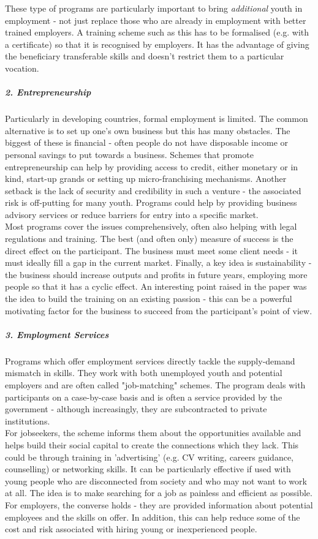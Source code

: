 \documentclass[a4paper, 10pt]{article}
\begin{document}
\noindent These type of programs are particularly important to bring \textit{additional} youth in employment - not just replace those who are already in employment with better trained employers. A training scheme such as this has to be formalised (e.g. with a certificate) so that it is recognised by employers. It has the advantage of giving the beneficiary transferable skills and doesn't restrict them to a particular vocation. 

\subparagraph*{2. Entrepreneurship}
Particularly in developing countries, formal employment is limited. The common alternative is to set up one's own business but this has many obstacles. The biggest of these is financial - often people do not have disposable income or personal savings to put towards a business. Schemes that promote entrepreneurship can help by providing access to credit, either monetary or in kind, start-up grands or setting up micro-franchising mechanisms. Another setback is the lack of security and credibility in such a venture - the associated risk is off-putting for many youth. Programs could help by providing business advisory services or reduce barriers for entry into a specific market. \\

\noindent Most programs cover the issues comprehensively, often also helping with legal regulations and training. The best (and often only) measure of success is the direct effect on the participant. The business must meet some client needs - it must ideally fill a gap in the current market. Finally, a key idea is sustainability - the business should increase outputs and profits in future years, employing more people so that it has a cyclic effect. An interesting point raised in the paper was the idea to build the training on an existing passion - this can be a powerful motivating factor for the business to succeed from the participant's point of view. 

\subparagraph*{3. Employment Services}
Programs which offer employment services directly tackle the supply-demand mismatch in skills. They work with both unemployed youth and potential employers and are often called "job-matching" schemes. The program deals with participants on a case-by-case basis and is often a service provided by the government - although increasingly, they are subcontracted to private institutions. \\

\noindent For jobseekers, the scheme informs them about the opportunities available and helps build their social capital to create the connections which they lack. This could be through training in 'advertising' (e.g. CV writing, careers guidance, counselling) or networking skills. It can be particularly effective if used with young people who are disconnected from society and who may not want to work at all. The idea is to make searching for a job as painless and efficient as possible. For employers, the converse holds - they are provided information about potential employees and the skills on offer. In addition, this can help reduce some of the cost and risk associated with hiring young or inexperienced people. 
\end{document}
